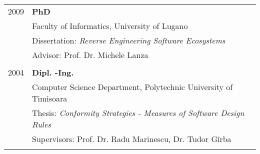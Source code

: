 
\newcommand{\degree}[5]{ \hspace{1.6cm}#2 & {\bf #1}\\ & #3\\ &#4\\ &#5\\ \\ }

\begin{tabular}{ r p{11cm}}

\degree
	{PhD}
	{2009}
	{Faculty of Informatics, University of Lugano}
	{Dissertation: {\em Reverse Engineering Software Ecosystems}}
	{Advisor: Prof. Dr. Michele Lanza}

\degree
	{Dipl. -Ing.}
	{2004}
	{Computer Science Department, Polytechnic University of Timisoara}
	{Thesis: \emph{Conformity Strategies - Measures of Software Design Rules}}
	{Supervisors: Prof. Dr. Radu Marinescu, Dr. Tudor G\^irba}

\end{tabular}
